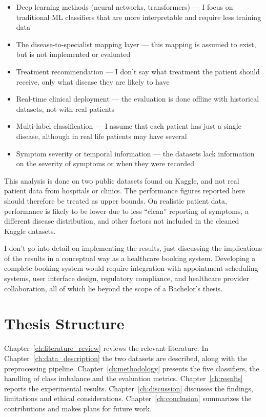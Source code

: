 \begin{itemize}
    \item Deep learning methods (neural networks, transformers) --- I focus on traditional ML classifiers that are more interpretable and require less training data
    \item The disease-to-specialist mapping layer --- this mapping is assumed to exist, but is not implemented or evaluated
    \item Treatment recommendation --- I don't say what treatment the patient should receive, only what disease they are likely to have
    \item Real-time clinical deployment --- the evaluation is done offline with historical datasets, not with real patients
    \item Multi-label classification --- I assume that each patient has just a single disease, although in real life patients may have several
    \item Symptom severity or temporal information --- the datasets lack information on the severity of symptoms or when they were recorded
\end{itemize}

This analysis is done on two public datasets found on Kaggle, and not real patient data from hospitals or clinics. The performance figures reported here should therefore be treated as upper bounds. On realistic patient data, performance is likely to be lower due to less ``clean'' reporting of symptoms, a different disease distribution, and other factors not included in the cleaned Kaggle datasets.

I don't go into detail on implementing the results, just discussing the implications of the results in a conceptual way as a healthcare booking system. Developing a complete booking system would require integration with appointment scheduling systems, user interface design, regulatory compliance, and healthcare provider collaboration, all of which lie beyond the scope of a Bachelor's thesis.

\section{Thesis Structure}
\label{sec:thesis_structure}

Chapter~\ref{ch:literature_review} reviews the relevant literature. In Chapter~\ref{ch:data_description} the two datasets are described, along with the preprocessing pipeline. Chapter~\ref{ch:methodology} presents the five classifiers, the handling of class imbalance and the evaluation metrics. Chapter~\ref{ch:results} reports the experimental results. Chapter~\ref{ch:discussion} discusses the findings, limitations and ethical considerations. Chapter~\ref{ch:conclusion} summarizes the contributions and makes plans for future work.
